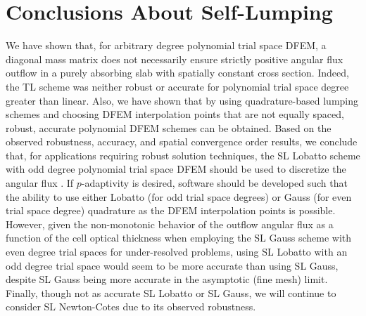 \section{Conclusions About Self-Lumping}

We have shown that, for arbitrary degree polynomial trial space DFEM, a diagonal mass matrix does not necessarily ensure strictly positive angular flux outflow in a purely absorbing slab with spatially constant cross section.  
Indeed, the TL scheme was neither robust or accurate for polynomial trial space degree greater than linear.
 Also, we have shown that by using quadrature-based lumping schemes and choosing DFEM interpolation points that are not equally spaced, robust, accurate polynomial DFEM schemes can be obtained.  
 Based on the observed robustness, accuracy, and spatial convergence order results, we conclude that, for applications requiring robust solution techniques, the SL Lobatto scheme with odd degree polynomial trial space DFEM should be used to discretize the angular flux .  
 If $p$-adaptivity is desired, software should be developed such that the ability to use either Lobatto (for odd trial space degrees) or Gauss (for even trial space degree) quadrature as the DFEM interpolation points is possible.  
 However, given the non-monotonic behavior of the outflow angular flux as a function of the cell optical thickness when employing the SL Gauss scheme with even degree trial spaces for under-resolved problems, using SL Lobatto  with an odd degree trial space would seem to be more accurate than using SL Gauss, despite SL Gauss being more accurate in the asymptotic (fine mesh) limit.
Finally, though not as accurate SL Lobatto or SL Gauss, we will continue to consider SL Newton-Cotes due to its observed robustness.



